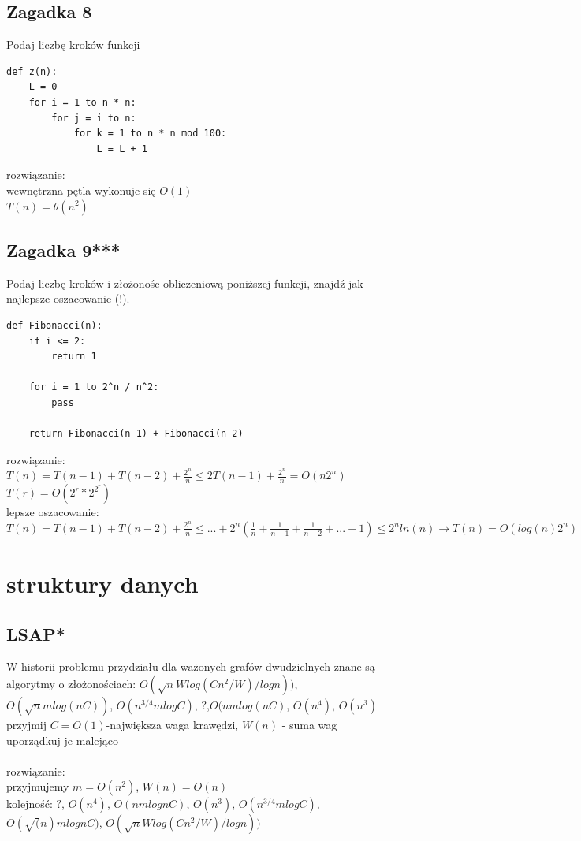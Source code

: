 \documentclass{article}
\begin{document}
\subsection*{Zagadka 8}
Podaj liczbę kroków funkcji
\begin{lstlisting}
def z(n):
	L = 0
	for i = 1 to n * n:
		for j = i to n:
			for k = 1 to n * n mod 100:
				L = L + 1
\end{lstlisting}
rozwiązanie: \\
wewnętrzna pętla wykonuje się $O(1)$ \\
$T(n) = \theta(n^2)$

\subsection*{Zagadka 9***}
Podaj liczbę kroków i złożonośc obliczeniową poniższej funkcji, znajdź jak najlepsze oszacowanie (!).
\begin{lstlisting}
def Fibonacci(n):
	if i <= 2:
		return 1

	for i = 1 to 2^n / n^2:
		pass
	
	return Fibonacci(n-1) + Fibonacci(n-2)

\end{lstlisting}
rozwiązanie: \\
$T(n) = T(n-1) + T(n-2) + \frac{2^n}{n} \leq 2T(n-1) + \frac{2^n}{n} = O(n2^n)$ \\
$T(r) = O(2^r * 2^{2^r})$ \\
lepsze oszacowanie: $T(n) = T(n-1) + T(n-2) + \frac{2^n}{n} \leq ... + 2^n(\frac{1}{n} + \frac{1}{n-1} + \frac{1}{n-2} + ... + 1) \leq 2^n ln(n) \rightarrow T(n) = O(log(n) 2^n)$ 

\section{struktury danych}
\subsection*{LSAP*}
W historii problemu przydziału dla ważonych grafów dwudzielnych znane są algorytmy o złożonościach:
$O(\sqrt{n}Wlog(Cn^2/W)/logn))$, $O(\sqrt{n}mlog(nC))$, $O(n^{3/4}mlogC)$, $?$,$O(nmlog(nC)$, $O(n^4)$, $O(n^3)$
\\ przyjmij $C = O(1)$-największa waga krawędzi,  $W(n)$ - suma wag \\ uporządkuj je malejąco \\\\
rozwiązanie: \\
przyjmujemy $m = O(n^2)$, $ W(n) = O(n)$ \\
kolejność: $?$, $O(n^4)$,  $O(nmlognC)$, $O(n^3)$, $O(n^{3/4}mlogC)$, $O(\sqrt(n)mlognC)$, $O(\sqrt{n}Wlog(Cn^2/W)/logn))$
\end{document}
